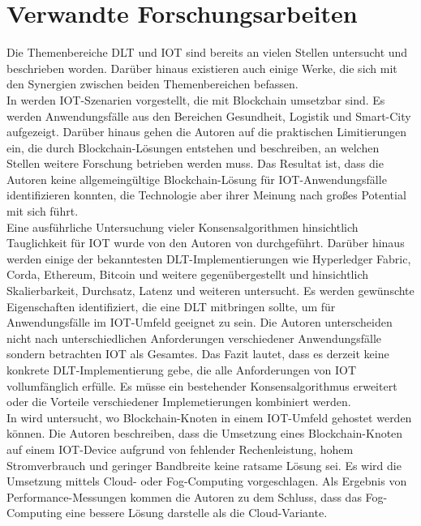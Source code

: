 \chapter{Verwandte Forschungsarbeiten}
\label{ch:relatedwork}
Die Themenbereiche \ac{DLT} und \ac{IOT} sind bereits an vielen Stellen untersucht und beschrieben worden. Darüber hinaus existieren auch einige Werke, die sich mit den Synergien zwischen beiden Themenbereichen befassen.\\
In \cite{Review2018} werden \ac{IOT}-Szenarien vorgestellt, die mit Blockchain umsetzbar sind. Es werden Anwendungsfälle aus den Bereichen Gesundheit, Logistik und Smart-City aufgezeigt. Darüber hinaus gehen die Autoren auf die praktischen Limitierungen ein, die durch Blockchain-Lösungen entstehen und beschreiben, an welchen Stellen weitere Forschung betrieben werden muss. Das Resultat ist, dass die Autoren keine allgemeingültige Blockchain-Lösung für \ac{IOT}-Anwendungsfälle identifizieren konnten, die Technologie aber ihrer Meinung nach großes Potential mit sich führt.\\
Eine ausführliche Untersuchung vieler Konsensalgorithmen hinsichtlich Tauglichkeit für \ac{IOT} wurde von den Autoren von \cite{Salimitari2018ASO} durchgeführt. Darüber hinaus werden einige der bekanntesten DLT-Implementierungen wie Hyperledger Fabric, Corda, Ethereum, Bitcoin und weitere gegenübergestellt und hinsichtlich Skalierbarkeit, Durchsatz, Latenz und weiteren untersucht. Es werden gewünschte Eigenschaften identifiziert, die eine \ac{DLT} mitbringen sollte, um für Anwendungsfälle im \ac{IOT}-Umfeld geeignet zu sein. Die Autoren unterscheiden nicht nach unterschiedlichen Anforderungen verschiedener Anwendungsfälle sondern betrachten \ac{IOT} als Gesamtes. Das Fazit lautet, dass es derzeit keine konkrete \ac{DLT}-Implementierung gebe, die alle Anforderungen von \ac{IOT} vollumfänglich erfülle. Es müsse ein bestehender Konsensalgorithmus erweitert oder die Vorteile verschiedener Implemetierungen kombiniert werden.\\
In \cite{BaaS2016} wird untersucht, wo Blockchain-Knoten in einem \ac{IOT}-Umfeld gehostet werden können. Die Autoren beschreiben, dass die Umsetzung eines Blockchain-Knoten auf einem \ac{IOT}-Device aufgrund von fehlender Rechenleistung, hohem Stromverbrauch und geringer Bandbreite keine ratsame Lösung sei. Es wird die Umsetzung mittels Cloud- oder Fog-Computing vorgeschlagen. Als Ergebnis von Performance-Messungen kommen die Autoren zu dem Schluss, dass das Fog-Computing eine bessere Lösung darstelle als die Cloud-Variante.\\
